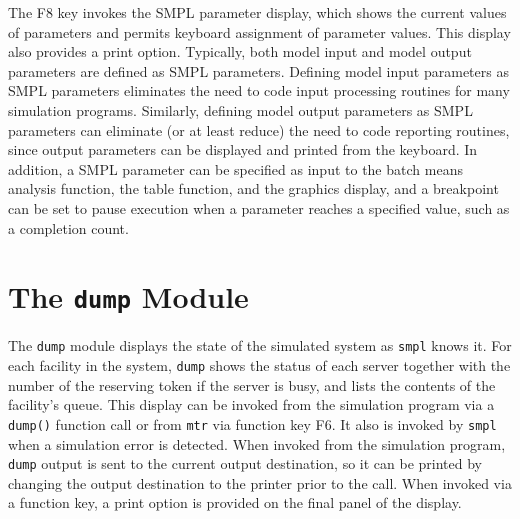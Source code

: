 The F8 key invokes the SMPL parameter display, which shows the
current values of parameters and permits keyboard assignment of parameter
values. This display also provides a print option. Typically, both model
input and model output parameters are defined as SMPL parameters. Defining
model input parameters as SMPL parameters eliminates the need to
code input processing routines for many simulation programs. Similarly,
defining model output parameters as SMPL parameters can eliminate (or at
least reduce) the need to code reporting routines, since output parameters can
be displayed and printed from the keyboard. In addition, a SMPL parameter
can be specified as input to the batch means analysis function, the table
function, and the graphics display, and a breakpoint can be set to pause
execution when a parameter reaches a specified value, such as a completion
count.

\section{The \texttt{dump} Module}
\label{sec:simenv-dump}

The \texttt{dump} module displays the state of the simulated system as \texttt{smpl}
knows it. For each facility in the system, \texttt{dump} shows the status of each
server together with the number of the reserving token if the server is busy,
and lists the contents of the facility's queue. This display can be invoked
from the simulation program via a \texttt{dump()} function call or from \texttt{mtr} via
function key F6. It also is invoked by \texttt{smpl} when a simulation error is
detected. When invoked from the simulation program, \texttt{dump} output is sent to
the current output destination, so it can be printed by changing the output
destination to the printer prior to the call. When invoked via a function
key, a print option is provided on the final panel of the display.

